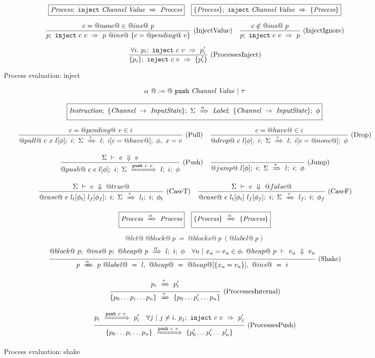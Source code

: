 
\begin{figure}

$$
\begin{array}{lr} 
  \boxed{\textit{Process};~\texttt{inject}~\textit{Channel}~\textit{Value}~\Rightarrow~\textit{Process}}
 & 
  \boxed{\{ \textit{Process} \};~\texttt{inject}~\textit{Channel}~\textit{Value}~\Rightarrow~\{ \textit{Process} \}}
 \end{array}
$$

$$
\enskip \frac {\displaystyle 
  c=@none@ \in @ins@~p
} {\displaystyle 
  p;~\texttt{inject}~c~v~\Rightarrow~p ~@ins@~ \{ c = @pending@~v\}
} \  \mbox{(InjectValue)} \enskip
\enskip \frac {\displaystyle 
  c \not\in @ins@~p
} {\displaystyle 
  p;~\texttt{inject}~c~v~\Rightarrow~p
} \  \mbox{(InjectIgnore)} \enskip
$$

$$
\enskip \frac {\displaystyle 
  \forall i.~ p_i;~\texttt{inject}~c~v~\Rightarrow~p'_i
} {\displaystyle 
  \{ p_i \};~\texttt{inject}~c~v~\Rightarrow~\{ p'_i \}
} \  \mbox{(ProcessesInject)} \enskip
$$

\caption{Process evaluation: inject}
\label{fig:Process:Eval:Inject}
\end{figure}


\begin{figure}

$$
\alpha~@:=@~ \texttt{push}~\textit{Channel}~\textit{Value} ~|~ \tau
$$

$$
  \boxed{
    \textit{Instruction};~\{\textit{Channel} ~\to~ \textit{InputState}\};~\Sigma~\xRightarrow{\alpha}~\textit{Label};~\{\textit{Channel} ~\to~ \textit{InputState}\};~\phi
  }
$$


$$
\enskip \frac {\displaystyle 
  c=@pending@~v \in i
} {\displaystyle 
  @pull@~c~x~l[\phi];~i;~\Sigma~\xRightarrow{\tau}~l;~i[c=@have@];~\phi,~x = v
} \  \mbox{(Pull)} \enskip
\enskip \frac {\displaystyle 
  c=@have@ \in i
} {\displaystyle 
  @drop@~c~l[\phi];~i;~\Sigma~\xRightarrow{\tau}~l;~i[c=@none@];~\phi
} \  \mbox{(Drop)} \enskip
$$

$$
\enskip \frac {\displaystyle 
  \Sigma~\vdash~e~\Downarrow~v
} {\displaystyle 
  @push@~c~e~l[\phi];~i;~\Sigma~\xRightarrow{\texttt{push}~c~v}~l;~i;~\phi
} \  \mbox{(Push)} \enskip
\enskip \frac {\displaystyle 
} {\displaystyle 
  @jump@~l[\phi];~i;~\Sigma~\xRightarrow{\tau}~l;~i;~\phi
} \  \mbox{(Jump)} \enskip
$$

$$
\enskip \frac {\displaystyle 
  \Sigma~\vdash~e~\Downarrow~@true@
} {\displaystyle 
  @case@~e~l_t[\phi_t]~l_f[\phi_f];~i;~\Sigma~\xRightarrow{\tau}~l_t;~i;~\phi_t
} \  \mbox{(CaseT)} \enskip
\enskip \frac {\displaystyle 
  \Sigma~\vdash~e~\Downarrow~@false@
} {\displaystyle 
  @case@~e~l_t[\phi_t]~l_f[\phi_f];~i;~\Sigma~\xRightarrow{\tau}~l_f;~i;~\phi_f
} \  \mbox{(CaseF)} \enskip
$$

$$
  \boxed{\textit{Process}~\xRightarrow{\alpha}~\textit{Process}}
  \quad
  \boxed{\{ \textit{Process} \}~\xRightarrow{\alpha}~\{ \textit{Process} \}}
$$

$$
@let@~@block@~p~=~@blocks@~p~(@label@~p)
$$
$$
\enskip \frac {\displaystyle 
  @block@~p;~@ins@~p;~@heap@~p~\xRightarrow{\alpha}~l;~i;~\phi
  \quad
  \forall u~|~x_u=e_u \in \phi.~
    @heap@~p~\vdash~e_u~\Downarrow~v_u
} {\displaystyle 
  p~\xRightarrow{\alpha}~p~@label@~=~l,~@heap@~=~@heap@[\{ x_u=v_u \}],~@ins@~=~i
} \  \mbox{(Shake)} \enskip
$$




$$
\ruleIN{
  \ProcShake{p_i}{\tau}{p'_i}
}{
  \ProcsShake{
    \sgl{p_0 \ldots p_i \ldots p_n}
  }{\tau}{
    \sgl{p_0 \ldots p'_i \ldots p_n}
  }
}{ProcessesInternal}
$$

$$
\ruleIN{
  \ProcShake{p_i}{\Push~c~v}{p'_i}
  \quad
  \forall j~|~j \neq i.~
  \ProcInject{p_j}{c}{v}{p'_j}
}{
  \ProcsShake{
    \sgl{p_0 \ldots p_i \ldots p_n}
  }{\Push~c~v}{
    \sgl{p'_0 \ldots p'_i \ldots p'_n}
  }
}{ProcessesPush}
$$


\caption{Process evaluation: shake}
\label{fig:Process:Eval:Shake}
\end{figure}

